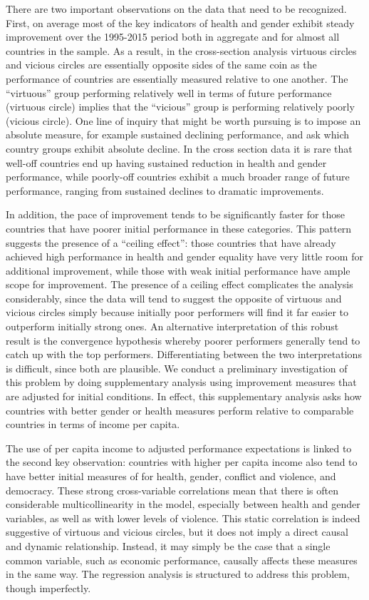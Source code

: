 \documentclass[12pt]{article}
\begin{document}
There are two important observations on the data that need to be recognized. First, on average most of the key indicators of health and gender exhibit steady improvement over the 1995-2015 period both in aggregate and for almost all countries in the sample. As a result, in the cross-section analysis virtuous circles and vicious circles are essentially opposite sides of the same coin as the performance of countries are essentially measured relative to one another. The \enquote{virtuous} group performing relatively well in terms of future performance (virtuous circle) implies that the \enquote{vicious} group is performing relatively poorly (vicious circle). One line of inquiry that might be worth pursuing is to impose an absolute measure, for example sustained declining performance, and ask which country groups exhibit absolute decline. In the cross section data it is rare that well-off countries end up having sustained reduction in health and gender performance, while poorly-off countries exhibit a much broader range of future performance, ranging from sustained declines to dramatic improvements.

In addition, the pace of improvement tends to be significantly faster for those countries that have poorer initial performance in these categories. This pattern suggests the presence of a \enquote{ceiling effect}: those countries that have already achieved high performance in health and gender equality have very little room for additional improvement, while those with weak initial performance have ample scope for improvement. The presence of a ceiling effect complicates the analysis considerably, since the data will tend to suggest the opposite of virtuous and vicious circles simply because initially poor performers will find it far easier to outperform initially strong ones. An alternative interpretation of this robust result is the convergence hypothesis whereby poorer performers generally tend to catch up with the top performers. Differentiating between the two interpretations is difficult, since both are plausible. We conduct a preliminary investigation of this problem by doing supplementary analysis using improvement measures that are adjusted for initial conditions. In effect, this supplementary analysis asks how countries with better gender or health measures perform relative to comparable countries in terms of income per capita.

The use of per capita income to adjusted performance expectations is linked to the second key observation: countries with higher per capita income also tend to have better initial measures of for health, gender, conflict and violence, and democracy. These strong cross-variable correlations mean that there is often considerable multicollinearity in the model, especially between health and gender variables, as well as with lower levels of violence. This static correlation is indeed suggestive of virtuous and vicious circles, but it does not imply a direct causal and dynamic relationship. Instead, it may simply be the case that a single common variable, such as economic performance, causally affects these measures in the same way. The regression analysis is structured to address this problem, though imperfectly.
\end{document}
